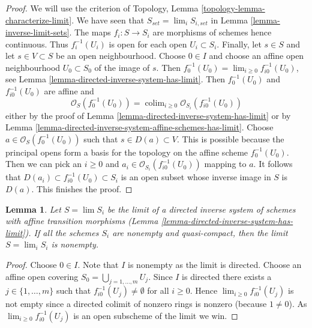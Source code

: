 \documentclass{stacks-project}
\theoremstyle{plain}
\newtheorem{lemma}[subsection]{Lemma}
\theoremstyle{definition}
\theoremstyle{remark}
\numberwithin{equation}{subsection}
\def\lim{\mathop{\mathrm{lim}}\nolimits}
\def\colim{\mathop{\mathrm{colim}}\nolimits}
\begin{document}
\begin{proof}
We will use the criterion of
Topology, Lemma \ref{topology-lemma-characterize-limit}.
We have seen that $S_{set} = \lim_i S_{i, set}$ in
Lemma \ref{lemma-inverse-limit-sets}.
The maps $f_i : S \to S_i$ are morphisms of schemes
hence continuous. Thus $f_i^{-1}(U_i)$ is open for each
open $U_i \subset S_i$. Finally, 
let $s \in S$ and let $s \in V \subset S$ be an open
neighbourhood. Choose $0 \in I$ and choose an
affine open neighbourhood $U_0 \subset S_0$ of the image of $s$.
Then $f_0^{-1}(U_0) = \lim_{i \geq 0} f_{i0}^{-1}(U_0)$, see
Lemma \ref{lemma-directed-inverse-system-has-limit}.
Then $f_0^{-1}(U_0)$ and $f_{i0}^{-1}(U_0)$ are affine and
$$
\mathcal{O}_S(f_0^{-1}(U_0)) =
\colim_{i \geq 0} \mathcal{O}_{S_i}(f_{i0}^{-1}(U_0))
$$
either by the proof of
Lemma \ref{lemma-directed-inverse-system-has-limit}
or by
Lemma \ref{lemma-directed-inverse-system-affine-schemes-has-limit}.
Choose $a \in \mathcal{O}_S(f_0^{-1}(U_0))$ such that
$s \in D(a) \subset V$. This is possible because the principal
opens form a basis for the topology on the affine scheme $f_0^{-1}(U_0)$.
Then we can pick an $i \geq 0$ and
$a_i \in \mathcal{O}_{S_i}(f_{i0}^{-1}(U_0))$ mapping to $a$.
It follows that $D(a_i) \subset f_{i0}^{-1}(U_0) \subset S_i$
is an open subset whose inverse image in $S$ is $D(a)$.
This finishes the proof.
\end{proof}

\begin{lemma}
\label{lemma-limit-nonempty}
Let $S = \lim S_i$ be the limit of a directed inverse system
of schemes with affine transition morphisms
(Lemma \ref{lemma-directed-inverse-system-has-limit}).
If all the schemes $S_i$ are nonempty and quasi-compact,
then the limit $S = \lim_i S_i$ is nonempty.
\end{lemma}

\begin{proof}
Choose $0 \in I$. Note that $I$ is nonempty as the limit is directed.
Choose an affine open covering $S_0 = \bigcup_{j = 1, \ldots, m} U_j$.
Since $I$ is directed there exists a $j \in \{1, \ldots, m\}$
such that $f_{i0}^{-1}(U_j) \not = \emptyset$ for all
$i \geq 0$. Hence $\lim_{i \geq 0} f_{i0}^{-1}(U_j)$ is not
empty since a directed colimit of nonzero rings is nonzero
(because $1 \not = 0$). As $\lim_{i \geq 0} f_{i0}^{-1}(U_j)$
is an open subscheme of the limit we win.
\end{proof}
\end{document}

